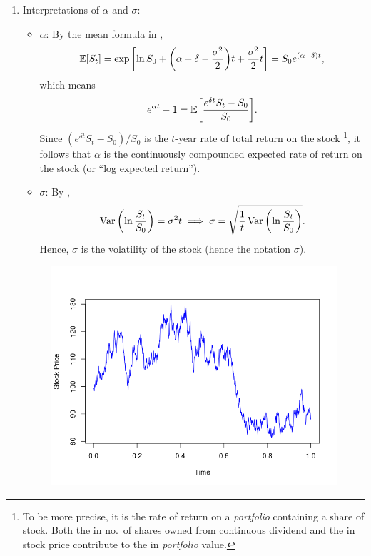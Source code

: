\begin{enumerate}
\item \label{it:alpha-sigma-interpret}
Interpretations of \(\alpha\) and \(\sigma\):
\begin{itemize}
\item \(\alpha\): By the mean formula in ,
\[
\mathbb{E}\qty[S_t]=\exp\qty[\ln S_0+\qty(\alpha-\delta-\frac{\sigma^2}{2})t+\frac{\sigma^2}{2}t]
=S_0e^{(\alpha-\delta)t},
\]
which means
\[
e^{\alpha t}-1=\mathbb{E}\qty[\frac{e^{\delta t}S_t-S_0}{S_0}].
\]
Since \((e^{\delta t}S_t-S_0)/S_0\) is the \(t\)-year rate of total return
on the stock \footnote{To be more precise, it is the rate of
return on a \emph{portfolio} containing a share of stock. Both the
 in no.\ of shares owned from continuous dividend and the
 in stock price contribute to the  in
\emph{portfolio} value.}, it follows that \(\alpha\) is the continuously
compounded expected rate of return on the stock  (or ``log
expected return'').
\item \(\sigma\): By ,
\[
\operatorname{Var}\qty(\ln\frac{S_t}{S_0})=\sigma^2t
\implies
\sigma=\sqrt{\frac{1}{t}\operatorname{Var}\qty(\ln\frac{S_t}{S_0})}.
\]
Hence, \(\sigma\) is the volatility of the stock  (hence the
notation \(\sigma\)).
\end{itemize}
\begin{figure}[!h]
\includegraphics{images/bs-stock-price}

\end{figure}
\end{enumerate}
